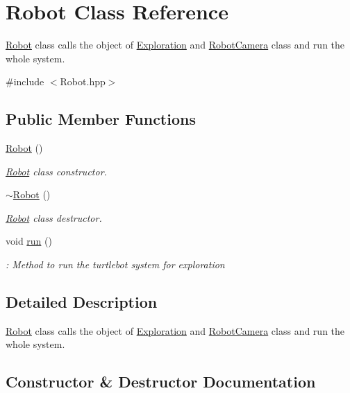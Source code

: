 \hypertarget{class_robot}{}\section{Robot Class Reference}
\label{class_robot}


\hyperlink{class_robot}{Robot} class calls the object of \hyperlink{class_exploration}{Exploration} and \hyperlink{class_robot_camera}{Robot\+Camera} class and run the whole system.  




{\ttfamily \#include $<$Robot.\+hpp$>$}

\subsection*{Public Member Functions}
\begin{DoxyCompactItemize}
\item 
\hyperlink{class_robot_a4fc7c70ae20623f05e06f2ecb388b6c4}{Robot} ()
\begin{DoxyCompactList}\small\item\em \hyperlink{class_robot}{Robot} class constructor. \end{DoxyCompactList}\item 
\hyperlink{class_robot_a924320124b09c2f2ac1621aa210d5f38}{$\sim$\+Robot} ()
\begin{DoxyCompactList}\small\item\em \hyperlink{class_robot}{Robot} class destructor. \end{DoxyCompactList}\item 
void \hyperlink{class_robot_a00d8702f14f86ba41d2a8c0d466fab2b}{run} ()
\begin{DoxyCompactList}\small\item\em \+: Method to run the turtlebot system for exploration \end{DoxyCompactList}\end{DoxyCompactItemize}


\subsection{Detailed Description}
\hyperlink{class_robot}{Robot} class calls the object of \hyperlink{class_exploration}{Exploration} and \hyperlink{class_robot_camera}{Robot\+Camera} class and run the whole system. 

\subsection{Constructor \& Destructor Documentation}
